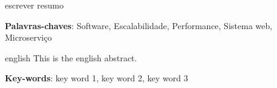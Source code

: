 \setlength{\absparsep}{18pt} %
\begin{resumo}

  escrever resumo

  \textbf{Palavras-chaves}: Software, Escalabilidade, Performance, Sistema web, Microserviço

\end{resumo}

\begin{resumo}[Abstract]
 \begin{otherlanguage*}{english}
   This is the english abstract.

   \vspace{\onelineskip}

   \noindent
   \textbf{Key-words}: key word 1, key word 2, key word 3
 \end{otherlanguage*}
\end{resumo}
